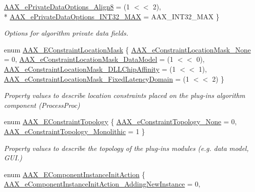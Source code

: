 \begin{DoxyCompactItemize}
\hyperlink{a00206_a9f1ef2cb64daf30eaf145dfbb8cd0d00aa683ca703d91945336394793308ba4b1}{A\+A\+X\+\_\+e\+Private\+Data\+Options\+\_\+\+Align8} = (1 $<$$<$ 2), 
\\*
\hyperlink{a00206_a9f1ef2cb64daf30eaf145dfbb8cd0d00a9c5ada412f70b8a06d1bddb469ef86f2}{A\+A\+X\+\_\+e\+Private\+Data\+Options\+\_\+\+I\+N\+T32\+\_\+\+M\+A\+X} = A\+A\+X\+\_\+\+I\+N\+T32\+\_\+\+M\+A\+X
 \}
\begin{DoxyCompactList}\small\item\em Options for algorithm private data fields. \end{DoxyCompactList}\item 
enum \hyperlink{a00206_a0c5d795c1fd021c5b9b541febc34601a}{A\+A\+X\+\_\+\+E\+Constraint\+Location\+Mask} \{ \hyperlink{a00206_a0c5d795c1fd021c5b9b541febc34601aad4acf90ffba6c9b3290d5e8708b2898a}{A\+A\+X\+\_\+e\+Constraint\+Location\+Mask\+\_\+\+None} = 0, 
\hyperlink{a00206_a0c5d795c1fd021c5b9b541febc34601aa027df08c137702400a92719828bea44b}{A\+A\+X\+\_\+e\+Constraint\+Location\+Mask\+\_\+\+Data\+Model} = (1 $<$$<$ 0), 
\hyperlink{a00206_a0c5d795c1fd021c5b9b541febc34601aa0bcc93a22d3477c447eb751514e8fa94}{A\+A\+X\+\_\+e\+Constraint\+Location\+Mask\+\_\+\+D\+L\+L\+Chip\+Affinity} = (1 $<$$<$ 1), 
\hyperlink{a00206_a0c5d795c1fd021c5b9b541febc34601aa12ffeaf435dc753cbd90adb409b739cd}{A\+A\+X\+\_\+e\+Constraint\+Location\+Mask\+\_\+\+Fixed\+Latency\+Domain} = (1 $<$$<$ 2)
 \}
\begin{DoxyCompactList}\small\item\em Property values to describe location constraints placed on the plug-\/in\textquotesingle{}s algorithm component ({\ttfamily Process\+Proc}) \end{DoxyCompactList}\item 
enum \hyperlink{a00206_a714f56a9b0ab98a3a5365760adf77624}{A\+A\+X\+\_\+\+E\+Constraint\+Topology} \{ \hyperlink{a00206_a714f56a9b0ab98a3a5365760adf77624a2514682fbd713adf583ac9188323dc72}{A\+A\+X\+\_\+e\+Constraint\+Topology\+\_\+\+None} = 0, 
\hyperlink{a00206_a714f56a9b0ab98a3a5365760adf77624a5f6fe83329b40c9fd0f70fb7b7377121}{A\+A\+X\+\_\+e\+Constraint\+Topology\+\_\+\+Monolithic} = 1
 \}
\begin{DoxyCompactList}\small\item\em Property values to describe the topology of the plug-\/in\textquotesingle{}s modules (e.\+g. data model, G\+U\+I.) \end{DoxyCompactList}\item 
enum \hyperlink{a00206_aff5646376a3c93f032cf2400e0885023}{A\+A\+X\+\_\+\+E\+Component\+Instance\+Init\+Action} \{ \hyperlink{a00206_aff5646376a3c93f032cf2400e0885023a656bb1583e8039af81e3b19b98790183}{A\+A\+X\+\_\+e\+Component\+Instance\+Init\+Action\+\_\+\+Adding\+New\+Instance} = 0, 

\end{DoxyCompactItemize}
